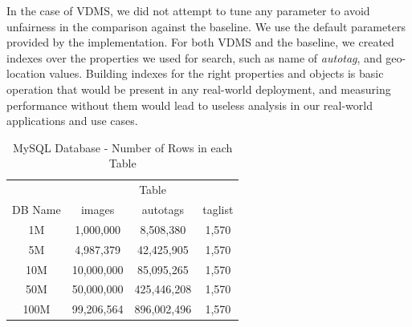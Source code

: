 In the case of VDMS, we did not attempt to tune any
parameter to avoid unfairness in the comparison against the baseline.
We use the default parameters provided by the implementation.
For both VDMS and the baseline, we created indexes over the 
properties we used for search, such as name of 
\textit{autotag}, and geo-location values.
Building indexes for the right properties and objects
is basic operation that would be present in any real-world deployment,
and measuring performance without them would lead to useless analysis in our
real-world applications and use cases.

\begin{table}[ht]
\caption{MySQL Database - Number of Rows in each Table}
\centering
\begin{tabular}{c c c c}
\hline\hline
 & \multicolumn{3}{c}{Table}\\
\cline{2-4}
DB Name & images & autotags & taglist\\
\hline
1M   & 1,000,000  & 8,508,380   & 1,570\\
5M   & 4,987,379  & 42,425,905  & 1,570\\
10M  & 10,000,000 & 85,095,265  & 1,570\\
50M  & 50,000,000 & 425,446,208 & 1,570\\
100M & 99,206,564 & 896,002,496 & 1,570\\
\hline
\end{tabular}
\label{table:mysqltables}
\end{table}

